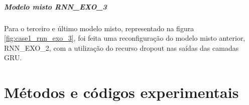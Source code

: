         \paragraph{Modelo misto RNN\_EXO\_3}
        Para o terceiro e último modelo misto, representado na figura \ref{fig:case1_rnn_exo_3}, foi feita uma reconfiguração do modelo misto anterior, RNN\_EXO\_2, com a utilização do recurso dropout nas saídas das camadas GRU.
        \begin{figure}[h]
        \end{figure}
        

	\chapter{Métodos e códigos experimentais}\label{chapter:outros}

